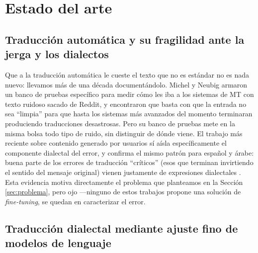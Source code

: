\documentclass[11pt,a4paper]{article}
\begin{document}
\section{Estado del arte}
\label{sec:estado-arte}

\subsection{Traducción automática y su fragilidad ante la jerga y los dialectos}

Que a la traducción automática le cueste el texto que no es estándar no es nada nuevo: llevamos más de una década documentándolo. Michel y Neubig \cite{michel2018mtnt} armaron un banco de pruebas específico para medir cómo les iba a los sistemas de MT con texto ruidoso sacado de Reddit, y encontraron que basta con que la entrada no sea ``limpia'' para que hasta los sistemas más avanzados del momento terminaran produciendo traducciones desastrosas. Pero su banco de pruebas mete en la misma bolsa todo tipo de ruido, sin distinguir de dónde viene. El trabajo más reciente sobre contenido generado por usuarios sí aísla específicamente el componente dialectal del error, y confirma el mismo patrón para español y árabe: buena parte de los errores de traducción ``críticos'' (esos que terminan invirtiendo el sentido del mensaje original) vienen justamente de expresiones dialectales \cite{twitteremotion, zbib-cited-via-arabic}. Esta evidencia motiva directamente el problema que planteamos en la Sección \ref{sec:problema}, pero ojo —ninguno de estos trabajos propone una solución de \textit{fine-tuning}, se quedan en caracterizar el error.

\subsection{Traducción dialectal mediante ajuste fino de modelos de lenguaje}
\end{document}
